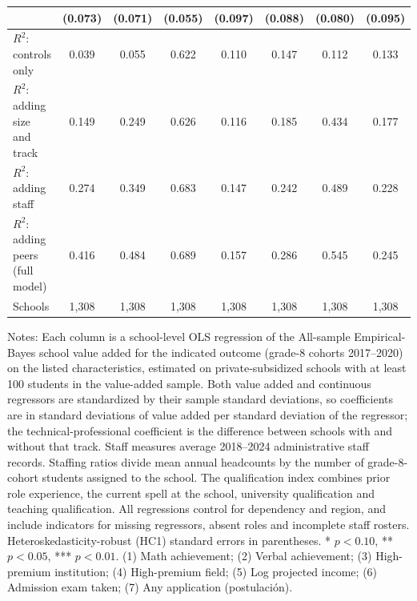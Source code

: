 \begin{table}[!htbp]
{\begin{tabular}{lccccccc}
 & (0.073) & (0.071) & (0.055) & (0.097) & (0.088) & (0.080) & (0.095) \\
\midrule
$R^2$: controls only & 0.039 & 0.055 & 0.622 & 0.110 & 0.147 & 0.112 & 0.133 \\
$R^2$: adding size and track & 0.149 & 0.249 & 0.626 & 0.116 & 0.185 & 0.434 & 0.177 \\
$R^2$: adding staff & 0.274 & 0.349 & 0.683 & 0.147 & 0.242 & 0.489 & 0.228 \\
$R^2$: adding peers (full model) & 0.416 & 0.484 & 0.689 & 0.157 & 0.286 & 0.545 & 0.245 \\
Schools & 1,308 & 1,308 & 1,308 & 1,308 & 1,308 & 1,308 & 1,308 \\
\bottomrule
\end{tabular}}
\par\medskip
\footnotesize
\begin{minipage}{\textwidth}
Notes: Each column is a school-level OLS regression of the All-sample Empirical-Bayes school value added for the indicated outcome (grade-8 cohorts 2017--2020) on the listed characteristics, estimated on private-subsidized schools with at least 100 students in the value-added sample. Both value added and continuous regressors are standardized by their sample standard deviations, so coefficients are in standard deviations of value added per standard deviation of the regressor; the technical-professional coefficient is the difference between schools with and without that track. Staff measures average 2018--2024 administrative staff records. Staffing ratios divide mean annual headcounts by the number of grade-8-cohort students assigned to the school. The qualification index combines prior role experience, the current spell at the school, university qualification and teaching qualification. All regressions control for dependency and region, and include indicators for missing regressors, absent roles and incomplete staff rosters. Heteroskedasticity-robust (HC1) standard errors in parentheses. * $p<0.10$, ** $p<0.05$, *** $p<0.01$. (1) Math achievement; (2) Verbal achievement; (3) High-premium institution; (4) High-premium field; (5) Log projected income; (6) Admission exam taken; (7) Any application (postulaci\'on).
\end{minipage}
\end{table}
